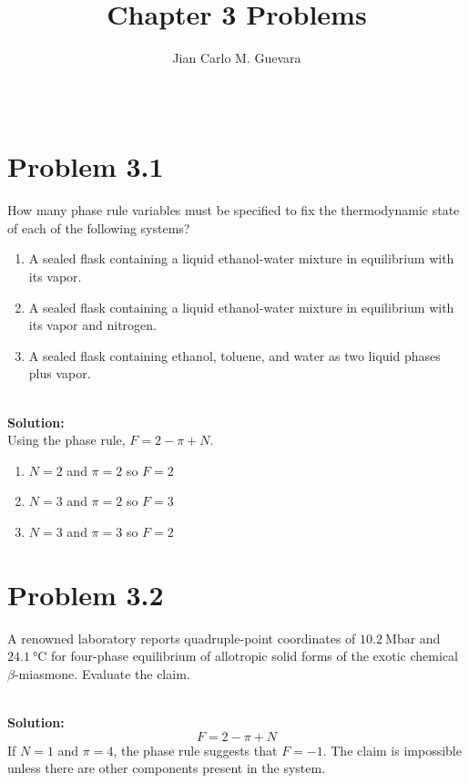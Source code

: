 \documentclass{article}
\title{Chapter 3 Problems}
\author{Jian Carlo M. Guevara}
\date{~}
\newenvironment{solution}{\par\noindent\textbf{\\Solution:\\}}{\par\medskip}
\begin{document}
\maketitle
\vspace{-3em}
\tableofcontents

\section*{Problem 3.1}
How many phase rule variables must be specified to fix the thermodynamic state of each of the following systems?
\begin{enumerate}[label=(\alph*)]
    \item A sealed flask containing a liquid ethanol-water mixture in equilibrium with its vapor.
    \item A sealed flask containing a liquid ethanol-water mixture in equilibrium with its vapor and nitrogen.
    \item A sealed flask containing ethanol, toluene, and water as two liquid phases plus vapor.
\end{enumerate}

\begin{solution}
    Using the phase rule, $F=2-\pi+N$.
    \begin{enumerate}[label=(\alph*)]
        \item $N=2$ and $\pi=2$ so $\boxed{ F=2 }$
        \item $N=3$ and $\pi=2$ so $\boxed{ F=3 }$
        \item $N=3$ and $\pi=3$ so $\boxed{ F=2 }$
    \end{enumerate}
\end{solution}

\section*{Problem 3.2}
A renowned laboratory reports quadruple-point coordinates of $10.2~\unit{\mega\bar}$ and $24.1~\unit{\degreeCelsius}$ for four-phase equilibrium of allotropic solid forms of the exotic chemical $\beta$-miasmone. Evaluate the claim.

\begin{solution}
    \begin{equation*}
        F=2-\pi+N
    \end{equation*}
    If $N=1$ and $\pi=4$, the phase rule suggests that $F=-1$. The claim is impossible unless there are other components present in the system.
\end{solution}
\end{document}

